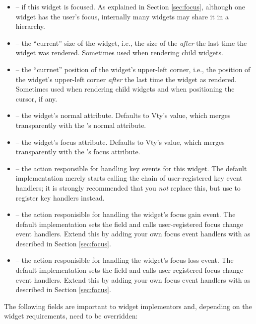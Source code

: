 \begin{itemize}
\item {} --  if this widget is focused.  As
  explained in Section \ref{sec:focus}, although one widget has the
  user's focus, internally many widgets may share it in a hierarchy.
\item {} -- the ``current'' size of the widget, i.e.,
  the size of the  \textit{after} the last time the widget
  was rendered.  Sometimes used when rendering child widgets.
\item {} -- the ``currnet'' position of the widget's
  upper-left corner, i.e., the position of the widget's upper-left
  corner \textit{after} the last time the widget as rendered.
  Sometimes used when rendering child widgets and when positioning the
  cursor, if any.
\item {} -- the widget's normal attribute.  Defaults
  to Vty's  value, which merges transparently with the
  's normal attribute.
\item {} -- the widget's focus attribute.  Defaults
  to Vty's  value, which merges transparently with the
  's focus attribute.
\item {} -- the action responsible for handling key
  events for this widget.  The default implementation merely starts
  calling the chain of user-registered key event handlers; it is
  strongly recommended that you \textit{not} replace this, but use
   to register key handlers instead.
\item {} -- the action responisible for handling
  the widget's focus gain event.  The default implementation sets the
   field and calls user-registered focus change event
  handlers.  Extend this by adding your own focus event handlers with
   as described in Section \ref{sec:focus}.
\item {} -- the action responisible for handling
  the widget's focus loss event.  The default implementation sets the
   field and calls user-registered focus change event
  handlers.  Extend this by adding your own focus event handlers with
   as described in Section \ref{sec:focus}.
\end{itemize}

The following fields are important to widget implementors and,
depending on the widget requirements, need to be overridden:

